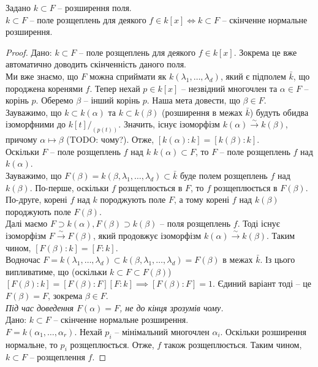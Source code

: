 \documentclass{math_library}
\begin{document}
\begin{theorem}
Задано $k \subset F$ -- розширення поля.\\
$k \subset F$ -- поле розщеплень для деякого $f \in k[x] \iff k \subset F$ -- скінченне нормальне розширення.
\end{theorem}

\begin{proof}
\rightproof Дано: $k \subset F$ -- поле розщеплень для деякого $f \in k[x]$. Зокрема це вже автоматично доводить скінченність даного поля.\\
Ми вже знаємо, що $F$ можна сприймати як $k(\lambda_1,\dots,\lambda_d)$, який є підполем $\bar{k}$, що породжена коренями $f$. Тепер нехай $p \in k[x]$ -- незвідний многочлен та $\alpha \in F$ -- корінь $p$. Оберемо $\beta$ -- інший корінь $p$. Наша мета довести, що $\beta \in F$.\\
Зауважимо, що $k \subset k(\alpha)$ та $k \subset k(\beta)$ (розширення в межах $\bar{k}$) будуть обидва ізоморфними до $k[t]/_{(p(t))}$. Значить, існує ізоморфізм $k(\alpha) \overset{\sim}{\to} k(\beta)$, причому $\alpha \mapsto \beta$ (TODO: чому?). Отже, $[k(\alpha):k] = [k(\beta):k]$.\\
Оскільки $F$ -- поле розщеплень $f$ над $k$  $k(\alpha) \subset F$, то $F$ -- поле розщеплень $f$ над $k(\alpha)$.\\
Зауважимо, що $F(\beta) = k(\beta,\lambda_1,\dots,\lambda_d) \subset \bar{k}$ буде полем розщеплень $f$ над $k(\beta)$. По-перше, оскільки $f$ розщеплюється в $F$, то $f$ розщеплюється в $F(\beta)$. По-друге, корені $f$ над $k$ породжують поле $F$, а тому корені $f$ над $k(\beta)$ породжують поле $F(\beta)$.\\
Далі маємо $F\supset k(\alpha), F(\beta) \supset k(\beta)$ -- поля розщеплень $f$. Тоді існує ізоморфізм $F \overset{\sim}{\to} F(\beta)$, який продовжує ізоморфізм $k(\alpha) \overset{\sim}{\to} k(\beta)$. Таким чином, $[F(\beta):k] = [F:k]$.\\
Водночас $F = k(\lambda_1,\dots,\lambda_d) \subset k(\beta,\lambda_1,\dots,\lambda_d) = F(\beta)$ в межах $\bar{k}$. Із цього випливатиме, що (оскільки $k \subset F \subset F(\beta)$) $[F(\beta):k] = [F(\beta):F][F:k] \implies [F(\beta):F] = 1$. Єдиний варіант тоді -- це $F(\beta) = F$, зокрема $\beta \in F$.\\
\textit{Під час доведення $F(\alpha) = F$, не до кінця зрозумів чому.}
\bigskip \\
\leftproof Дано: $k \subset F$ -- скінченне нормальне розширення.\\
$F = k(\alpha_1,\dots,\alpha_r)$. Нехай $p_i$ -- мінімальний многочлен $\alpha_i$. Оскільки розширення нормальне, то $p_i$ розщеплюється. Отже, $f$ також розщеплюється. Таким чином, $k \subset F$ -- розщеплення $f$.
\end{proof}
\end{document}
